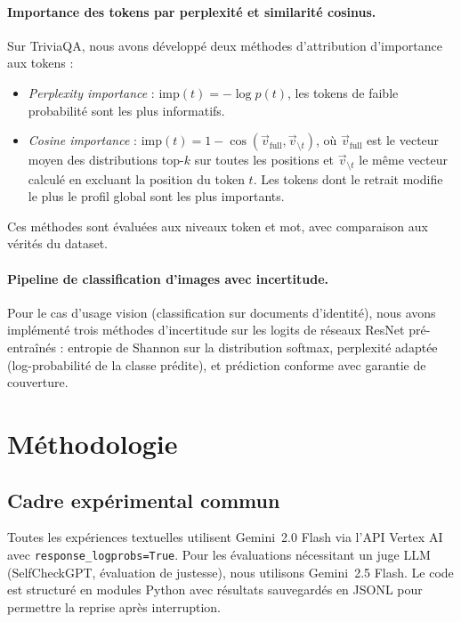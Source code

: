 \documentclass[a4paper, 11pt]{article}
\begin{document}
\paragraph{Importance des tokens par perplexité et similarité cosinus.}
Sur TriviaQA, nous avons développé deux méthodes d'attribution d'importance aux tokens :
\begin{itemize}[nosep]
    \item \emph{Perplexity importance} : $\text{imp}(t) = -\log p(t)$, les tokens de faible probabilité sont les plus informatifs.
    \item \emph{Cosine importance} : $\text{imp}(t) = 1 - \cos(\vec{v}_{\text{full}}, \vec{v}_{\setminus t})$, où $\vec{v}_{\text{full}}$ est le vecteur moyen des distributions top-$k$ sur toutes les positions et $\vec{v}_{\setminus t}$ le même vecteur calculé en excluant la position du token $t$. Les tokens dont le retrait modifie le plus le profil global sont les plus importants.
\end{itemize}
Ces méthodes sont évaluées aux niveaux token et mot, avec comparaison aux vérités du dataset.
\paragraph{Pipeline de classification d'images avec incertitude.}
Pour le cas d'usage vision (classification sur documents d'identité), nous avons implémenté trois méthodes d'incertitude sur les logits de réseaux ResNet pré-entraînés : entropie de Shannon sur la distribution softmax, perplexité adaptée (log-probabilité de la classe prédite), et prédiction conforme avec garantie de couverture.
\section{Méthodologie}
\subsection{Cadre expérimental commun}
Toutes les expériences textuelles utilisent Gemini~2.0 Flash via l'API Vertex AI avec \texttt{response\_logprobs=True}. Pour les évaluations nécessitant un juge LLM (SelfCheckGPT, évaluation de justesse), nous utilisons Gemini~2.5 Flash. Le code est structuré en modules Python avec résultats sauvegardés en JSONL pour permettre la reprise après interruption.
\end{document}

